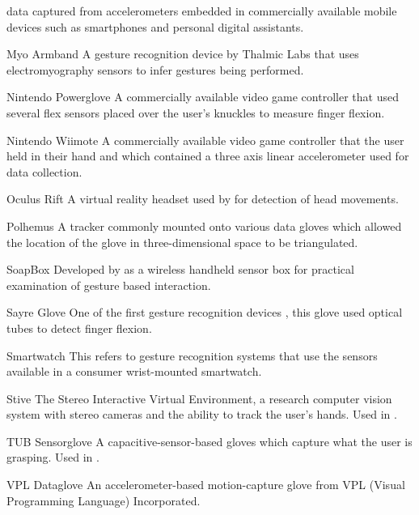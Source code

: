 \begin{Nomencl}[1cm]
        data captured from accelerometers embedded in commercially available
        mobile devices such as smartphones and personal digital assistants.
    \item[Myo Armband] A gesture recognition device by Thalmic Labs that uses
        electromyography sensors to infer gestures being performed.
    \item[Nintendo Powerglove] A commercially available video game controller
        that used several flex sensors placed over the user's knuckles to
        measure finger flexion.
    \item[Nintendo Wiimote] A commercially available video game controller that
        the user held in their hand and which contained a three axis linear
        accelerometer used for data collection.
    \item[Oculus Rift] A virtual reality headset used by
        \cite{zhaoRealtimeHeadGesture2017} for detection of head movements.
    \item[Polhemus] A tracker commonly mounted onto various data gloves which
        allowed the location of the glove in three-dimensional space to be triangulated.
    \item[SoapBox] Developed by \cite{mantyjarviEnablingFastEffortless2004} as
        a wireless handheld sensor box for practical examination of gesture
        based interaction.
    \item[Sayre Glove] One of the first gesture recognition
        devices \citep{thomasa.defantiUSNEAR60341631977}, this glove used
        optical tubes to detect finger flexion.
    \item[Smartwatch] This refers to gesture recognition systems that use the
        sensors available in a consumer wrist-mounted smartwatch.
    \item[Stive] The Stereo Interactive Virtual Environment, a research
        computer vision system with stereo cameras and the ability to track the
        user's hands. Used in \cite{wilsonParametricHiddenMarkov1999}.
    \item[TUB Sensorglove] A capacitive-sensor-based gloves which capture what
        the user is grasping. Used in \cite{hofmannVelocityProfileBased1998}.
    \item[VPL Dataglove]  An accelerometer-based motion-capture glove from VPL (Visual Programming Language) Incorporated.
\end{Nomencl}

